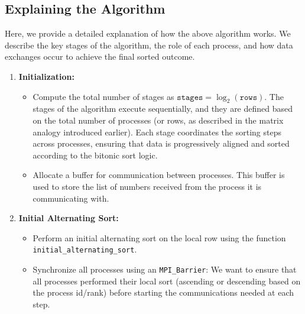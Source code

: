 \documentclass[12pt]{article}
\begin{document}
\newpage

\subsection{Explaining the Algorithm}
Here, we provide a detailed explanation of how the above algorithm works. We describe the key stages of the algorithm, the role of each process, and how data exchanges occur to achieve the final sorted outcome.

\begin{enumerate}[nosep]
    \item \textbf{Initialization:}
    \begin{itemize}[noitemsep]
        \item Compute the total number of stages as $\texttt{stages} = \log_2(\texttt{rows})$. The stages of the algorithm execute sequentially, and they are defined based on the total number of processes (or rows, as described in the matrix analogy introduced earlier). Each stage coordinates the sorting steps across processes, ensuring that data is progressively aligned and sorted according to the bitonic sort logic.
        \item Allocate a buffer for communication between processes. This buffer is used to store the list of numbers received from the process it is communicating with.
    \end{itemize}

    \item \textbf{Initial Alternating Sort:}
    \begin{itemize}[noitemsep]
        \item Perform an initial alternating sort on the local row using the function \\ \texttt{initial\_alternating\_sort}.
        \item Synchronize all processes using an \texttt{MPI\_Barrier}: We want to ensure that all processes performed their local sort (ascending or descending based on the process id/rank) before starting the communications needed at each step.
    \end{itemize}


\end{enumerate}
\end{document}
